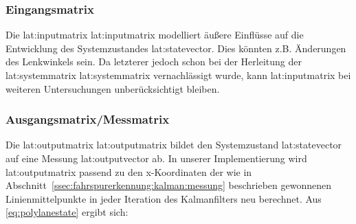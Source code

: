 \subsubsection{Eingangsmatrix}
Die \glsdesc{lat:inputmatrix} \gls{lat:inputmatrix} modelliert äußere Einflüsse auf die Entwicklung des Systemzustandes \gls{lat:statevector}. Dies könnten z.B. Änderungen des Lenkwinkels sein. Da letzterer jedoch schon bei der Herleitung der \glsdesc{lat:systemmatrix} \gls{lat:systemmatrix} vernachlässigt wurde, kann \gls{lat:inputmatrix} bei weiteren Untersuchungen unberücksichtigt bleiben.

\subsubsection{Ausgangsmatrix/Messmatrix} 
\label{sssec:fahrspurerkennung:kalman-filter:zustandsraumbeschreibung:outputmatrix}
Die \glsdesc{lat:outputmatrix} \gls{lat:outputmatrix} bildet den Systemzustand \gls{lat:statevector} auf eine Messung \gls{lat:outputvector} ab. In unserer Implementierung wird  \gls{lat:outputmatrix} passend zu den \gls{x}-Koordinaten der wie in Abschnitt~\ref{ssec:fahrspurerkennung:kalman:messung} beschrieben gewonnenen Linienmittelpunkte in jeder Iteration des Kalmanfilters neu berechnet. Aus \eqref{eq:polylanestate} ergibt sich:
